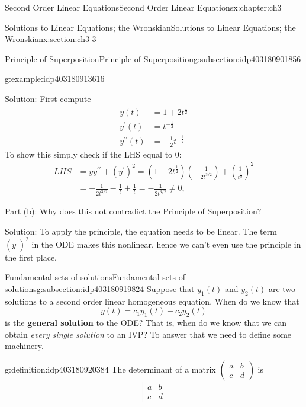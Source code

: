 \documentclass[oneside,10pt,]{book}
\newcommand{\terminology}[1]{\textbf{#1}}
\numberwithin{equation}{section}
\numberwithin{equation}{section}
\newcommand{\amp}{&}
\begin{document}
\begin{chapterptx}{Second Order Linear Equations}{}{Second Order Linear Equations}{}{}{x:chapter:ch3}
\begin{sectionptx}{Solutions to Linear Equations; the Wronskian}{}{Solutions to Linear Equations; the Wronskian}{}{}{x:section:ch3-3}
\begin{subsectionptx}{Principle of Superposition}{}{Principle of Superposition}{}{}{g:subsection:idp403180901856}
\begin{example}{}{g:example:idp403180913616}
\par
Solution: First compute%
\begin{align*}
y(t) \amp =1+2t^{\frac{1}{2}}\\
y^{\prime}(t) \amp =t^{-\frac{1}{2}}\\
y^{\prime\prime}(t) \amp =-\frac{1}{2}t^{-\frac{3}{2}}
\end{align*}
To show this simply check if the LHS equal to \(0\):%
\begin{align*}
LHS \amp =yy^{\prime\prime}+\left(y^{\prime}\right)^{2}=\left(1+2t^{\frac{1}{2}}\right)\left(-\frac{1}{2t^{3/2}}\right)+\left(\frac{1}{t^{\frac{1}{2}}}\right)^{2}\\
\amp =-\frac{1}{2t^{3/2}}-\frac{1}{t}+\frac{1}{t}=-\frac{1}{2t^{3/2}}\neq0,
\end{align*}
%
\par
Part (b): Why does this not contradict the Principle of Superposition?%
\par
Solution: To apply the principle, the equation needs to be linear. The term \(\left(y^{\prime}\right)^{2}\) in the ODE makes this nonlinear, hence we can't even use the principle in the first place.%
\end{example}
\end{subsectionptx}
%
%
\typeout{************************************************}
\typeout{************************************************}
%
\begin{subsectionptx}{Fundamental sets of solutions}{}{Fundamental sets of solutions}{}{}{g:subsection:idp403180919824}
Suppose that \(y_{1}(t)\) and \(y_{2}(t)\) are two solutions to a second order linear homogeneous equation. When do we know that%
\begin{equation*}
y(t)=c_{1}y_{1}(t)+c_{2}y_{2}(t)
\end{equation*}
is the \terminology{general solution} to the ODE? That is, when do we know that we can obtain \emph{every single solution} to an IVP? To answer that we need to define some machinery.%
\begin{definition}{}{g:definition:idp403180920384}%
The determinant of a matrix \(\left(\begin{array}{cc}
a \amp b\\
c \amp d
\end{array}\right)\) is%
\begin{equation*}
\left|\begin{array}{cc}
a \amp b\\
c \amp d

\end{array}
\end{equation*}
\end{definition}
\end{subsectionptx}
\end{sectionptx}
\end{chapterptx}
\end{document}
